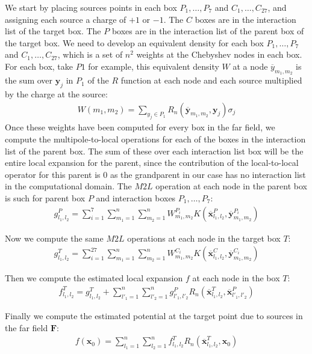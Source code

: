 \documentclass[11pt, oneside]{article}   	%
\begin{document}
We start by placing sources points in each box $P_1,\dots,P_7$ and $C_1,\dots,C_{27}$, and assigning each source a charge of $+1$ or $-1$. The $C$ boxes are in the interaction list of the target box. The $P$ boxes are in the interaction list of the parent box of the target box. We need to develop an equivalent density for each box $P_1,\dots,P_7$ and $C_1,\dots,C_{27}$, which is a set of $n^2$ weights at the Chebyshev nodes in each box. For each box, take $P1$ for example, this equivalent density $W$ at a node $\overline{y}_{m_1,m_2}$ is the sum over $\mathbf{y}_j$ in $P_1$ of the $R$ function at each node and each source multiplied by the charge at the source:
\begin{align}
W(m_1,m_2) = \sum_{y_j\in P_1} R_n(\mathbf{\overline{y}}_{m_1,m_2},\mathbf{y}_j)\sigma_j
\end{align}
Once these weights have been computed for every box in the far field, we compute the multipole-to-local operations for each of the boxes in the interaction list of the parent box. The sum of these over each interaction list box will be the entire local expansion for the parent, since the contribution of the local-to-local operator for this parent is $0$ as the grandparent in our case has no interaction list in the computational domain. The $M2L$ operation at each node in the parent box is such for parent box $P$ and interaction boxes $P_1,\dots,P_7$:
\begin{align}
g^P_{l_1,l_2} = \sum_{i=1}^7\sum_{m_1=1}^n\sum_{m_2=1}^n W_{m_1,m_2}^{P_i}K(\mathbf{\overline{x}}^P_{l_1,l_2},\mathbf{\overline{y}}^{P_i}_{m_1,m_2})
\end{align}

Now we compute the same $M2L$ operations at each node in the target box $T$:
\begin{align}
g^T_{l_1,l_2} = \sum_{i=1}^{27}\sum_{m_1=1}^n\sum_{m_2=1}^n W_{m_1,m_2}^{C_i}K(\mathbf{\overline{x}}^C_{l_1,l_2},\mathbf{\overline{y}}^{C_i}_{m_1,m_2})
\end{align}

Then we compute the estimated local expansion $f$ at each node in the box $T$:
\begin{align}
f^T_{l_1,l_2} = g^T_{l_1,l_2} + \sum_{l'_1=1}^n\sum_{l'_2=1}^n g^P_{l'_1,l'_2}R_n(\mathbf{\overline{x}}^T_{l_1,l_2},\mathbf{\overline{x}}^P_{l'_1,l'_2})
\end{align}

Finally we compute the estimated potential at the target point due to sources in the far field $\mathbf{F}$:
\begin{align}
f(\mathbf{x}_0) = \sum_{l_1=1}^n\sum_{l_2=1}^n f^T_{l_1,l_2} R_n(\mathbf{\overline{x}}^T_{l_1,l_2},\mathbf{x}_0)
\end{align}
\end{document}
